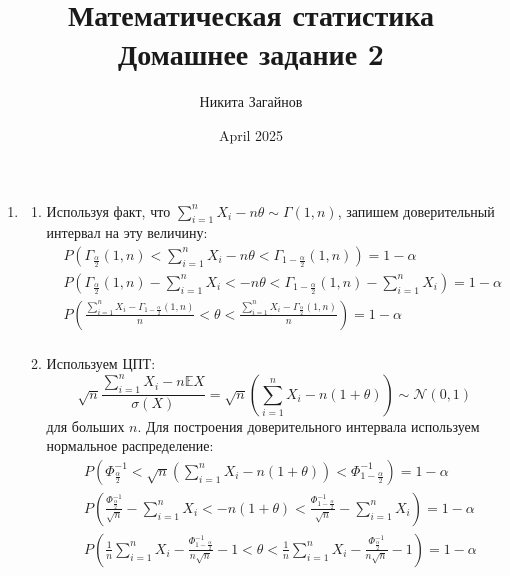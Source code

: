 \documentclass{article}
\title{Математическая статистика \\ Домашнее задание 2}
\author{Никита Загайнов}
\date{April 2025}
\begin{document}
\maketitle

\begin{enumerate}
	\item
	      \begin{enumerate}
		      \item Используя факт, что $\sum_{i=1}^{n} X_i - n\theta \sim \Gamma(1, n)$, запишем доверительный интервал на эту величину:
		            \begin{equation*}
			            \begin{aligned}
				             & P \left( \Gamma_{\frac{\alpha}{2}} (1, n) < \sum_{i=1}^{n} X_i - n\theta < \Gamma_{1 - \frac{\alpha}{2}} (1, n) \right) = 1 - \alpha                                         \\
				             & P \left( \Gamma_{\frac{\alpha}{2}} (1, n) - \sum_{i=1}^{n} X_i <  - n\theta < \Gamma_{1 - \frac{\alpha}{2}} (1, n) - \sum_{i=1}^{n} X_i \right) = 1 - \alpha                 \\
				             & P \left( \frac{\sum_{i=1}^{n} X_i - \Gamma_{1 - \frac{\alpha}{2}} (1, n)}{n} < \theta < \frac{\sum_{i=1}^{n} X_i - \Gamma_{\frac{\alpha}{2}} (1, n)}{n} \right) = 1 - \alpha \\
			            \end{aligned}
		            \end{equation*}

		      \item Используем ЦПТ:
		            \[
			            \sqrt{n} \frac{\sum_{i=1}^n X_i - n\mathbb{E}X}{\sigma(X)} = \sqrt{n} \left( \sum_{i=1}^n X_i - n(1 + \theta) \right) \sim \mathcal{N}(0, 1)
		            \]
		            для больших $n$. Для
		            построения доверительного интервала используем нормальное распределение:
		            \begin{equation*}
			            \begin{aligned}
				             & P \left( \Phi_{\frac{\alpha}{2}}^{-1} < \sqrt{n} \left( \sum_{i=1}^n X_i - n(1 + \theta) \right) < \Phi_{1 - \frac{\alpha}{2}}^{-1} \right) = 1 - \alpha                                                         \\
				             & P \left( \frac{\Phi_{\frac{\alpha}{2}}^{-1}}{\sqrt{n}} - \sum_{i=1}^n X_i < - n(1 + \theta) < \frac{\Phi_{1 - \frac{\alpha}{2}}^{-1}}{\sqrt{n}} - \sum_{i=1}^n X_i \right) = 1 - \alpha                          \\
				             & P \left( \frac{1}{n} \sum_{i=1}^n X_i - \frac{\Phi_{1 - \frac{\alpha}{2}}^{-1}}{n\sqrt{n}} - 1 < \theta < \frac{1}{n} \sum_{i=1}^n X_i - \frac{\Phi_{\frac{\alpha}{2}}^{-1}}{n\sqrt{n}} - 1 \right) = 1 - \alpha \\
			            \end{aligned}
		            \end{equation*}
	      \end{enumerate}


\end{enumerate}
\end{document}
